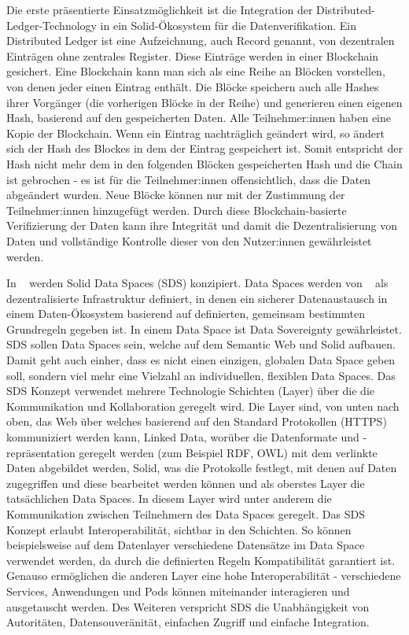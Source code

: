 \documentclass[acmtog]{acmart}
\begin{document}
Die erste präsentierte Einsatzmöglichkeit ist die Integration der Distributed-Ledger-Technology in ein Solid-Ökosystem für die Datenverifikation.
Ein Distributed Ledger ist eine Aufzeichnung, auch Record genannt, von dezentralen Einträgen ohne zentrales Register. Diese Einträge werden in einer Blockchain gesichert. Eine Blockchain kann man sich als eine Reihe an Blöcken vorstellen, von denen jeder einen Eintrag enthält. Die Blöcke speichern auch alle Hashes ihrer Vorgänger (die vorherigen Blöcke in der Reihe) und generieren einen eigenen Hash, basierend auf den gespeicherten Daten. Alle Teilnehmer:innen haben eine Kopie der Blockchain. Wenn ein Eintrag nachträglich geändert wird, so ändert sich der Hash des Blockes in dem der Eintrag gespeichert ist. Somit entspricht der Hash nicht mehr dem in den folgenden Blöcken gespeicherten Hash und die Chain ist gebrochen - es ist für die Teilnehmer:innen offensichtlich, dass die Daten abgeändert wurden. Neue Blöcke können nur mit der Zustimmung der Teilnehmer:innen hinzugefügt werden.
Durch diese Blockchain-basierte Verifizierung der Daten kann ihre Integrität und damit die Dezentralisierung von Daten und vollständige Kontrolle dieser von den Nutzer:innen gewährleistet werden. ~\cite{ramachandran2020towards}

In ~\cite{meckler2023web} werden Solid Data Spaces (SDS) konzipiert.
Data Spaces werden von ~\cite{nagel2021design} als dezentralisierte Infrastruktur definiert, in denen ein sicherer Datenaustausch in einem Daten-Ökosystem basierend auf definierten, gemeinsam bestimmten Grundregeln gegeben ist. In einem Data Space ist Data Sovereignty gewährleistet.
SDS sollen Data Spaces sein, welche auf dem Semantic Web und Solid aufbauen. Damit geht auch einher, dass es nicht einen einzigen, globalen Data Space geben soll, sondern viel mehr eine Vielzahl an individuellen, flexiblen Data Spaces.
Das SDS Konzept verwendet mehrere Technologie Schichten (Layer) über die die Kommunikation und Kollaboration geregelt wird. Die Layer sind, von unten nach oben, das Web über welches basierend auf den Standard Protokollen (HTTPS) kommuniziert werden kann, Linked Data, worüber die Datenformate und -repräsentation geregelt werden (zum Beispiel RDF, OWL) mit dem verlinkte Daten abgebildet werden, Solid, was die Protokolle festlegt, mit denen auf Daten zugegriffen und diese bearbeitet werden können und als oberstes Layer die tatsächlichen Data Spaces. In diesem Layer wird unter anderem die Kommunikation zwischen Teilnehmern des Data Spaces geregelt. Das SDS Konzept erlaubt Interoperabilität, sichtbar in den Schichten. So können beispielsweise auf dem Datenlayer verschiedene Datensätze im Data Space verwendet werden, da durch die definierten Regeln Kompatibilität garantiert ist. Genauso ermöglichen die anderen Layer eine hohe Interoperabilität - verschiedene Services, Anwendungen und Pods können miteinander interagieren und ausgetauscht werden. Des Weiteren verspricht SDS die Unabhängigkeit von Autoritäten, Datensouveränität, einfachen Zugriff und einfache Integration.
\end{document}
